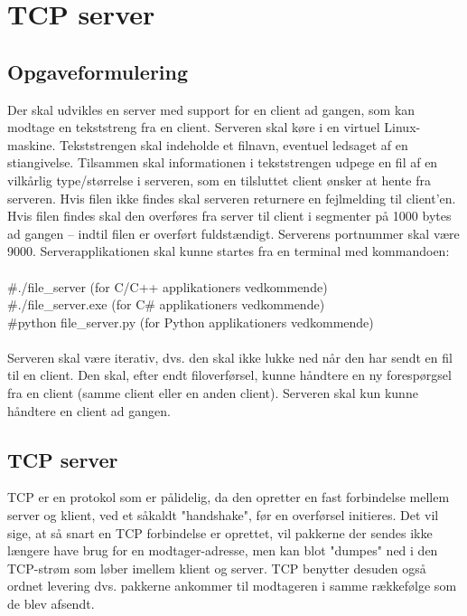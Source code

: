 \chapter{TCP server}

\section{Opgaveformulering}

Der skal udvikles en server med support for en client ad gangen, som kan modtage
en tekststreng fra en client. Serveren skal køre i en virtuel Linux-maskine.
Tekststrengen skal indeholde et filnavn, eventuel ledsaget af en stiangivelse.
Tilsammen skal informationen i tekststrengen udpege en fil af en vilkårlig
type/størrelse i serveren, som en tilsluttet client ønsker at hente fra serveren. Hvis
filen ikke findes skal serveren returnere en fejlmelding til client’en. Hvis filen findes
skal den overføres fra server til client i segmenter på 1000 bytes ad gangen – indtil
filen er overført fuldstændigt. Serverens portnummer skal være 9000. Serverapplikationen
skal kunne startes fra en terminal med kommandoen:\\ \\
\#./file\_server (for C/C++ applikationers vedkommende)\\
\#./file\_server.exe (for C\# applikationers vedkommende)\\
\#python file\_server.py (for Python applikationers vedkommende)\\ \\
Serveren skal være iterativ, dvs. den skal ikke lukke ned når den har sendt en fil til en
client. Den skal, efter endt filoverførsel, kunne håndtere en ny forespørgsel fra en
client (samme client eller en anden client).
Serveren skal kun kunne håndtere en client ad gangen.

\section{TCP server}

TCP er en protokol som er pålidelig, da den opretter en fast forbindelse mellem server og klient, ved et såkaldt "handshake", før en overførsel initieres. 
Det vil sige, at så snart en TCP forbindelse er oprettet, vil pakkerne der sendes ikke længere have brug for en modtager-adresse, men kan blot "dumpes" ned i den TCP-strøm som løber imellem klient og server. 
TCP benytter desuden også ordnet levering dvs. pakkerne ankommer til modtageren i samme rækkefølge som de blev afsendt.

